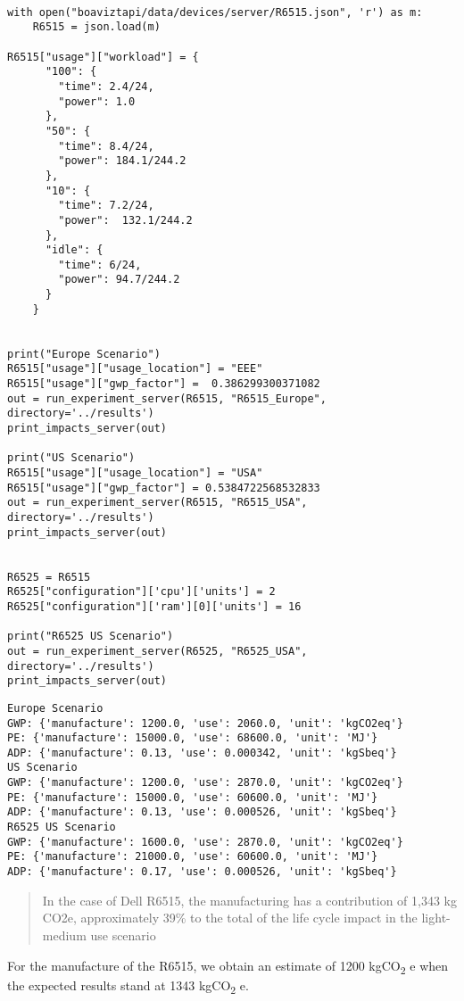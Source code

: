 \documentclass[11pt]{article}
\begin{document}
\begin{verbatim}

with open("boaviztapi/data/devices/server/R6515.json", 'r') as m:
    R6515 = json.load(m)

R6515["usage"]["workload"] = {
      "100": {
        "time": 2.4/24,
        "power": 1.0
      },
      "50": {
        "time": 8.4/24,
        "power": 184.1/244.2 
      },
      "10": {
        "time": 7.2/24,
        "power":  132.1/244.2
      },
      "idle": {
        "time": 6/24,
        "power": 94.7/244.2
      }
    }


print("Europe Scenario")
R6515["usage"]["usage_location"] = "EEE"
R6515["usage"]["gwp_factor"] =  0.386299300371082
out = run_experiment_server(R6515, "R6515_Europe", directory='../results')
print_impacts_server(out)

print("US Scenario")
R6515["usage"]["usage_location"] = "USA"
R6515["usage"]["gwp_factor"] = 0.5384722568532833
out = run_experiment_server(R6515, "R6515_USA", directory='../results')
print_impacts_server(out)


R6525 = R6515
R6525["configuration"]['cpu']['units'] = 2
R6525["configuration"]['ram'][0]['units'] = 16

print("R6525 US Scenario")
out = run_experiment_server(R6525, "R6525_USA", directory='../results')
print_impacts_server(out)
\end{verbatim}

\begin{verbatim}
Europe Scenario
GWP: {'manufacture': 1200.0, 'use': 2060.0, 'unit': 'kgCO2eq'}
PE: {'manufacture': 15000.0, 'use': 68600.0, 'unit': 'MJ'}
ADP: {'manufacture': 0.13, 'use': 0.000342, 'unit': 'kgSbeq'}
US Scenario
GWP: {'manufacture': 1200.0, 'use': 2870.0, 'unit': 'kgCO2eq'}
PE: {'manufacture': 15000.0, 'use': 60600.0, 'unit': 'MJ'}
ADP: {'manufacture': 0.13, 'use': 0.000526, 'unit': 'kgSbeq'}
R6525 US Scenario
GWP: {'manufacture': 1600.0, 'use': 2870.0, 'unit': 'kgCO2eq'}
PE: {'manufacture': 21000.0, 'use': 60600.0, 'unit': 'MJ'}
ADP: {'manufacture': 0.17, 'use': 0.000526, 'unit': 'kgSbeq'}
\end{verbatim}

\begin{quote}


In the case of Dell R6515, the manufacturing has a contribution of 1,343 kg CO2e, approximately 39\% to
the total of the life cycle impact in the light-medium use scenario
\end{quote}

For the manufacture of the R6515, we obtain an estimate of 1200 kgCO\textsubscript{2}
e when the expected results stand at 1343 kgCO\textsubscript{2} e.
\end{document}
